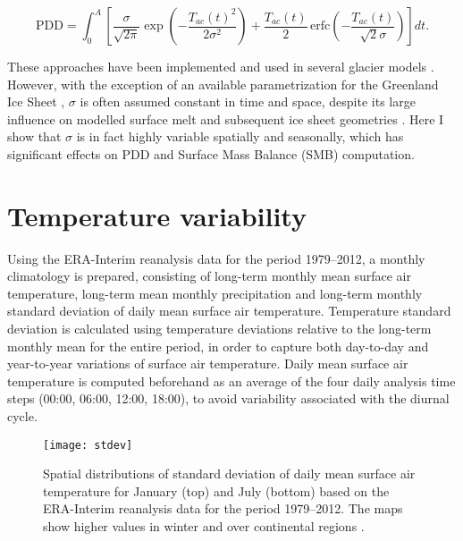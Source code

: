 \documentclass[review]{igs}
\begin{document}
\begin{equation} \label{eq:calovgreve}
  \mathrm{PDD} = \int_{0}^{A} \left[
    \frac{\sigma}{\sqrt{2\pi}}
    \exp\left({-\frac{T_{ac}(t)^2}{2\sigma^2}}\right)
    +\frac{T_{ac}(t)}{2} \,
    \mathrm{erfc} \left(-\frac{T_{ac}(t)}{\sqrt{2}\sigma}\right)
  \right]dt.
\end{equation}

These approaches have been implemented and used in several glacier models \citep[e.g.][]{letreguilly-etal-1991,greve-1997,huybrechts-dewolde-1999,seddik-etal-2012,charbit-etal-2013}. However, with the exception of an available parametrization for the Greenland Ice Sheet \citep{fausto-etal-2011}, $\sigma$ is often assumed constant in time and space, despite its large influence on modelled surface melt and subsequent ice sheet geometries \citep{charbit-etal-2013}. Here I show that $\sigma$ is in fact highly variable spatially and seasonally, which has significant effects on PDD and Surface Mass Balance (SMB) computation.


\section{Temperature variability}

Using the ERA-Interim reanalysis data \citep{data:erai} for the period 1979--2012, a monthly climatology is prepared, consisting of long-term monthly mean surface air temperature, long-term mean monthly precipitation and long-term monthly standard deviation of daily mean surface air temperature. Temperature standard deviation is calculated using temperature deviations relative to the long-term monthly mean for the entire period, in order to capture both day-to-day and year-to-year variations of surface air temperature. Daily mean surface air temperature is computed beforehand as an average of the four daily analysis time steps (00:00, 06:00, 12:00, 18:00), to avoid variability associated with the diurnal cycle.

\begin{figure}
  \centering\texttt{[image: stdev]}
  \caption{Spatial distributions of standard deviation of daily mean surface air temperature for January (top) and July (bottom) based on the ERA-Interim reanalysis data for the period 1979--2012. The maps show higher values in winter and over continental regions \citep{data:erai}.}
  \label{fig:stdev}
\end{figure}
\end{document}
